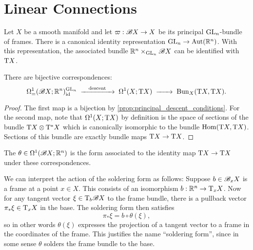 
\section{Linear Connections}
Let $X$ be a smooth manifold and let $\varpi : \mathscr{B} X \to X$ be its principal ${\operatorname{GL}}_n$-bundle of frames. There is a canonical identity representation ${\operatorname{GL}}_n \to \operatorname{Aut}(\mathbb{R}^n)$. With this representation, the associated bundle $\mathbb{R}^n\times_{{\operatorname{GL}}_n} \mathscr{B} X$ can be identified with $\mathrm{T} X$.

\begin{proposition}
  There are bijective correspondences:
\[
  \Omega^1_=(\B X; \R^n)^{\GL_n}_\id
  \lkxto[\textrm{descent}]
  \Omega^1(X; \T X)
  \lkxto
  \Bun_X(\T X, \T X).
\]
\end{proposition}

\begin{proof}
  The first map is a bijection by \cref{prop:principal_descent_conditions}. For the second map, note that $\Omega^1(X; \mathrm{T} X)$ by definition is the space of sections of the bundle $\mathrm{T} X\otimes \mathrm{T}^* X$ which is canonically isomorphic to the bundle $\operatorname{Hom}(\mathrm{T} X, \mathrm{T} X)$. Sections of this bundle are exactly bundle maps $\mathrm{T} X \to \mathrm{T} X$.
\end{proof}

\begin{definition}
  The  $\theta\in \Omega^1(\mathscr{B} X; \mathbb{R}^n)$ is the form associated to the identity map $\mathrm{T} X\to \mathrm{T} X$ under these correspondences.
\end{definition}

We can interpret the action of the soldering form as follows: Suppose $b\in \mathscr{B}_x X$ is a frame at a point $x\in X$. This consists of an isomorphism $b : \mathbb{R}^n \to \mathrm{T}_x X$.
Now for any tangent vector $\xi\in \mathrm{T}_b \mathscr{B} X$ to the frame bundle, there is a pullback vector $\pi_* \xi\in \mathrm{T}_x X$ in the base. 
The soldering form then satisfies
\[
    \pi_* \xi = b\circ \theta(\xi),
\]
so in other words $\theta(\xi)$ expresses the projection of a tangent vector to a frame in the coordinates of the frame. This justifies the name ``soldering form'', since in some sense $\theta$ solders the frame bundle to the base.


